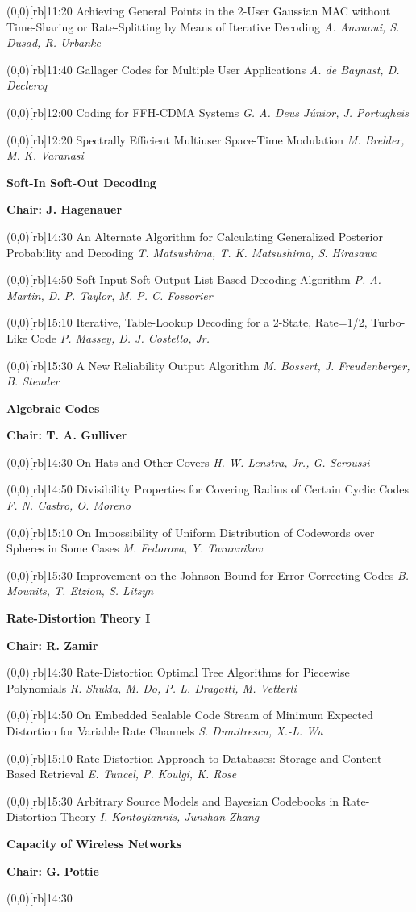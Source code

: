 \documentclass[a5paper,twoside]{article}
\def\period#1{\flushleft{\large\bfseries #1}\markboth{\sf #1}{\sf #1}}
\def\sesstitle#1{\vspace{.45\bigskipamount}\par{\bfseries #1}\par}
\def\sesschair#1{{\bfseries Chair: #1}\par\vspace{.65\medskipamount}}
\def\papertime#1{\makebox(0,0)[rb]{{\scriptsize #1}\hspace{.5em}}}
\def\papertitle#1{#1\hfil\break}
\def\paperauthors#1{{\itshape #1}\par\filbreak\vspace{.65\medskipamount}}
\begin{document}
\papertime{11:20}%
\papertitle{Achieving General Points in the 2-User Gaussian MAC without Time-Sharing or Rate-Splitting by Means of Iterative Decoding}
\paperauthors{A. Amraoui, S. Dusad, R. Urbanke}
\papertime{11:40}%
\papertitle{Gallager Codes for Multiple User Applications}
\paperauthors{A. de Baynast, D. Declercq}
\papertime{12:00}%
\papertitle{Coding for FFH-CDMA Systems}
\paperauthors{G. A. Deus J\'unior, J. Portugheis}
\papertime{12:20}%
\papertitle{Spectrally Efficient Multiuser Space-Time Modulation}
\paperauthors{M. Brehler, M. K. Varanasi}
\period{Thu 14:30 -- 15:50}
\sesstitle{Soft-In Soft-Out Decoding}
\sesschair{J. Hagenauer}
\papertime{14:30}%
\papertitle{An Alternate Algorithm for Calculating Generalized Posterior Probability and Decoding}
\paperauthors{T. Matsushima, T. K. Matsushima, S. Hirasawa}
\papertime{14:50}%
\papertitle{Soft-Input Soft-Output List-Based Decoding Algorithm}
\paperauthors{P. A. Martin, D. P. Taylor, M. P. C. Fossorier}
\papertime{15:10}%
\papertitle{Iterative, Table-Lookup Decoding for a 2-State, Rate=1/2, Turbo-Like Code}
\paperauthors{P. Massey, D. J. Costello, Jr.}
\papertime{15:30}%
\papertitle{A New Reliability Output Algorithm}
\paperauthors{M. Bossert, J. Freudenberger, B. Stender}
\sesstitle{Algebraic Codes}
\sesschair{T. A. Gulliver}
\papertime{14:30}%
\papertitle{On Hats and Other Covers}
\paperauthors{H. W. Lenstra, Jr., G. Seroussi}
\papertime{14:50}%
\papertitle{Divisibility Properties for Covering Radius of Certain Cyclic Codes}
\paperauthors{F. N. Castro, O. Moreno}
\papertime{15:10}%
\papertitle{On Impossibility of Uniform Distribution of Codewords over Spheres in Some Cases}
\paperauthors{M. Fedorova, Y. Tarannikov}
\papertime{15:30}%
\papertitle{Improvement on the Johnson Bound for Error-Correcting Codes}
\paperauthors{B. Mounits, T. Etzion, S. Litsyn}
\sesstitle{Rate-Distortion Theory I}
\sesschair{R. Zamir}
\papertime{14:30}%
\papertitle{Rate-Distortion Optimal Tree Algorithms for Piecewise Polynomials}
\paperauthors{R. Shukla, M. Do, P. L. Dragotti, M. Vetterli}
\papertime{14:50}%
\papertitle{On Embedded Scalable Code Stream of Minimum Expected Distortion for Variable Rate Channels}
\paperauthors{S. Dumitrescu, X.-L. Wu}
\papertime{15:10}%
\papertitle{Rate-Distortion Approach to Databases: Storage and Content-Based Retrieval}
\paperauthors{E. Tuncel, P. Koulgi, K. Rose}
\papertime{15:30}%
\papertitle{Arbitrary Source Models and Bayesian Codebooks in Rate-Distortion Theory}
\paperauthors{I. Kontoyiannis, Junshan Zhang}
\sesstitle{Capacity of Wireless Networks}
\sesschair{G. Pottie}
\papertime{14:30}%
\end{document}
